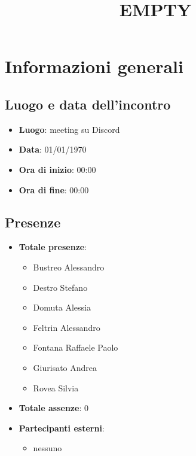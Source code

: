 \documentclass[12pt]{article}
\title{EMPTY}
\begin{document}
	\makefirstpage
	
	
	\clearpage
	
	\tableofcontents
	\clearpage

    \section{Informazioni generali}
	
	\subsection{Luogo e data dell'incontro}
	
    	\begin{itemize}
    		\item \textbf{Luogo}: meeting su Discord
    		\item \textbf{Data}: 01/01/1970
    		\item \textbf{Ora di inizio}: 00:00
    		\item \textbf{Ora di fine}: 00:00
    	\end{itemize}
	
	\subsection{Presenze}
	
    	\begin{itemize}
    		\item \textbf{Totale presenze}:
    		\begin{itemize}
    			\item Bustreo Alessandro
    			\item Destro Stefano
    			\item Domuta Alessia 
    			\item Feltrin Alessandro 
    			\item Fontana Raffaele Paolo 
    			\item Giurisato Andrea 
    			\item Rovea Silvia
    		\end{itemize}
    		
    		\item \textbf{Totale assenze}: 0
    		
    		\item \textbf{Partecipanti esterni}:
    		\begin{itemize}
    			\item nessuno
    		\end{itemize}
    	\end{itemize}
\end{document}
